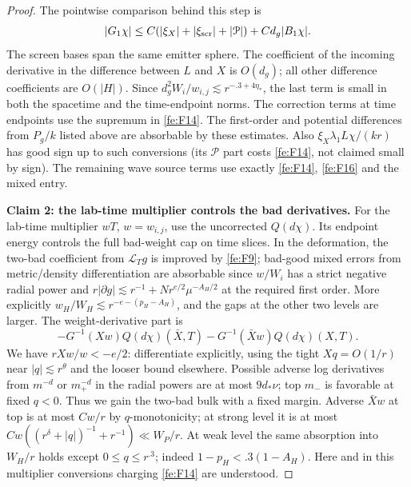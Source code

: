 \begin{proof}
The pointwise comparison behind this step is
\begin{equation*}
 |G_1\chi|\le C(|\xi_X|+|\xi_{\rm scr}|+|\mathcal P|)
                      +C d_g|B_1\chi|.
\end{equation*}
The screen bases span the same emitter sphere.  The coefficient of the
incoming derivative in the difference between $L$ and $X$ is $O(d_g)$;
all other difference coefficients are $O(|H|)$.
Since $d_g^2W_i/w_{i,j}\lesssim r^{-.3+4\eta_*}$, the last term is
small in both the spacetime and the time-endpoint norms.  The correction
terms at time endpoints use the supremum in \eqref{fe:F14}.
 The first-order and potential differences from \(P_g/k\) listed above are absorbable by these estimates. Also \(\xi_X\lambda_1 L\chi/(kr)\) has good sign up to such conversions (its \(\mathcal P\) part costs \eqref{fe:F14}, not claimed small by sign). The remaining wave source terms use exactly \eqref{fe:F14}, \eqref{fe:F16} and the mixed entry.

\par\medskip\noindent\textbf{Claim 2: the lab-time multiplier controls the bad derivatives.}\quad
For the lab-time multiplier \(wT\), \(w=w_{i,j}\), use the uncorrected \(Q(d\chi)\). Its endpoint energy controls the full bad-weight cap on time slices. In the deformation, the two-bad coefficient from \(\mathcal L_T g\) is improved by \eqref{fe:F9}; bad-good mixed errors from metric/density differentiation are absorbable since \(w/W_i\) has a strict negative radial power and \(r|\partial g|\lesssim r^{-1}+N r^{e/2}\mu^{-A_H/2}\) at the required first order. More explicitly \(w_H/W_H\lesssim r^{-e-(p_H-A_H)}\), and the gaps at the other two levels are larger. The weight-derivative part is
\begin{equation*}
-G^{-1} (Xw)Q(d\chi)(\bar X,T)
                     -G^{-1}(\bar Xw)Q(d\chi)(X,T).
\end{equation*}
We have \(r Xw/w<-e/2\): differentiate explicitly, using the tight \(Xq=O(1/r)\) near \(|q|\lesssim r^\theta\) and the looser bound elsewhere. Possible adverse log derivatives from \(m^{-d}\) or \(m_+^{-d}\) in the radial powers are at most \(9d_*\nu\); top \(m_-\) is favorable at fixed \(q<0\). Thus we gain the two-bad bulk with a fixed margin. Adverse \(\bar Xw\) at top is at most \(Cw/r\) by \(q\)-monotonicity; at strong level it is at most \(Cw((r^\delta+|q|)^{-1}+r^{-1})\ll W_P/r\). At weak level the same absorption into \(W_H/r\) holds except \(0\le q\le r^{.3}\); indeed \(1-p_H<.3(1-A_H)\). Here and in this multiplier conversions charging \eqref{fe:F14} are understood.


\end{proof}
